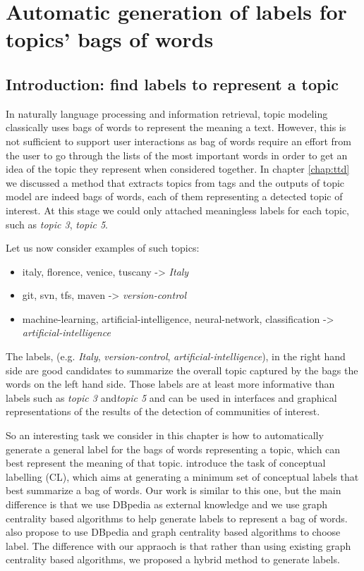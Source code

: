 \chapter{Automatic generation of labels for topics' bags of words}
\doublespacing
\label{chap:label}
\minitoc



\section{Introduction: find labels to represent a topic}
In naturally language processing and information retrieval, topic modeling classically uses bags of words to represent the meaning a text. However, this is not sufficient to support user interactions as bag of words require an effort from the user to go through the lists of the most important words in order to get an idea of the topic they represent when considered together.
In chapter \ref{chap:ttd} we discussed a method that extracts topics from tags and the outputs of topic model are indeed bags of words, each of them representing a detected topic of interest. At this stage we could only attached meaningless labels for each topic, such as \textit{topic 3}, \textit{topic 5}.

Let us now consider examples of such topics: 
\begin{itemize}
    \item {italy, florence, venice, tuscany -> \textit{Italy}}
    \item {git, svn, tfs, maven -> \textit{version-control}}
    \item {machine-learning, artificial-intelligence, neural-network, classification -> \textit{artificial-intelligence}}
\end{itemize}
The labels, (e.g. \textit{Italy}, \textit{version-control}, \textit{artificial-intelligence}), in the right hand side are good candidates to summarize the overall topic captured by the bags the words on the left hand side. Those labels are at least more informative than labels such as \textit{topic 3} and\textit{topic 5} and can be used in interfaces and graphical representations of the results of the detection of communities of interest.

So an interesting task we consider in this chapter is how to automatically generate a general label for the bags of words representing a topic, which can best represent the meaning of that topic. \cite{chp6OnConceptualLabelingOfBagOfWords} introduce the task of conceptual labelling (CL), which aims at generating a minimum set of conceptual labels that best summarize a bag of words. Our work is similar to this one, but the main difference is that we use DBpedia as external knowledge and we use graph centrality based algorithms to help generate labels to represent a bag of words. \cite{chp2hulpus2013unsupervisedtopiclabeling} also propose to use DBpedia and graph centrality based algorithms to choose label. The difference with our appraoch is that rather than using existing graph centrality based algorithms, we proposed a hybrid method to generate labels. 



